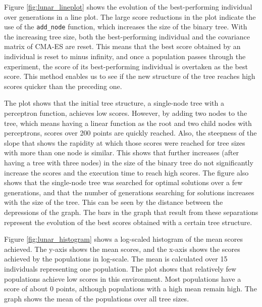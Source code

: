 Figure \ref{fig:lunar_lineplot} shows the evolution of the best-performing individual over generations in a line plot. The large score reductions in the plot indicate the use of the \texttt{add\_node} function, which increases the size of the binary tree. With the increasing tree size, both the best-performing individual and the covariance matrix of CMA-ES are reset. This means that the best score obtained by an individual is reset to minus infinity, and once a population passes through the experiment, the score of its best-performing individual is overtaken as the best score. This method enables us to see if the new structure of the tree reaches high scores quicker than the preceding one.

The plot shows that the initial tree structure, a single-node tree with a perceptron function, achieves low scores. However, by adding two nodes to the tree, which means having a linear function as the root and two child nodes with perceptrons, scores over 200 points are quickly reached. Also, the steepness of the slope that shows the rapidity at which those scores were reached for tree sizes with more than one node is similar. This shows that further increases (after having a tree with three nodes) in the size of the binary tree do not significantly increase the scores and the execution time to reach high scores. The figure also shows that the single-node tree was searched for optimal solutions over a few generations, and that the number of generations searching for solutions increases with the size of the tree. This can be seen by the distance between the depressions of the graph. The bars in the graph that result from these separations represent the evolution of the best scores obtained with a certain tree structure.

Figure \ref{fig:lunar_histogram} shows a log-scaled histogram of the mean scores achieved. The y-axis shows the mean scores, and the x-axis shows the scores achieved by the populations in log-scale. The mean is calculated over 15 individuals representing one population. The plot shows that relatively few populations achieve low scores in this environment. Most populations have a score of about 0 points, although populations with a high mean remain high. The graph shows the mean of the populations over all tree sizes.

